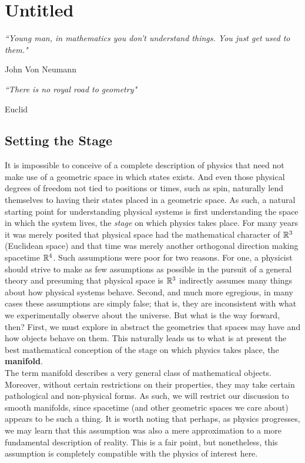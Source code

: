 \chapter{Untitled}
\epigraph{\textit{``Young man, in mathematics you don't understand things. You just get used to them."}}{John Von Neumann}
\epigraph{\textit{``There is no royal road to geometry"}}{Euclid}
\section*{Setting the Stage}

It is impossible to conceive of a complete description of physics that need not make use of a geometric space in which states exists.  And even those physical degrees of freedom not tied to positions or times, such as spin, naturally lend themselves to having their states placed in a geometric space.  As such, a natural starting point for understanding physical systems is first understanding the space in which the system lives, the \textit{stage} on which physics takes place.  For many years it was merely posited that physical space had the mathematical character of $\mathbb{R}^3$ (Euclidean space) and that time was merely another orthogonal direction making spacetime $\mathbb{R}^4$.  Such assumptions were poor for two reasons.  For one, a physicist should strive to make as few assumptions as possible in the pursuit of a general theory and presuming that physical space is $\mathbb{R}^3$ indirectly assumes many things about how physical systems behave. Second, and much more egregious, in many cases these assumptions are simply false; that is, they are inconsistent with what we experimentally observe about the universe.  But what is the way forward, then?  First, we must explore in abstract the geometries that spaces may have and how objects behave on them.  This naturally leads us to what is at present the best mathematical conception of the stage on which physics takes place, the \textbf{manifold}.\\

The term manifold describes a very general class of mathematical objects.  Moreover, without certain restrictions on their properties, they may take certain pathological and non-physical forms.  As such, we will restrict our discussion to smooth manifolds, since spacetime (and other geometric spaces we care about) appears to be such a thing.  It is worth noting that perhaps, as physics progresses, we may learn that this assumption was also a mere approximation to a more fundamental description of reality.  This is a fair point, but nonetheless, this assumption is completely compatible with the physics of interest here. \\

